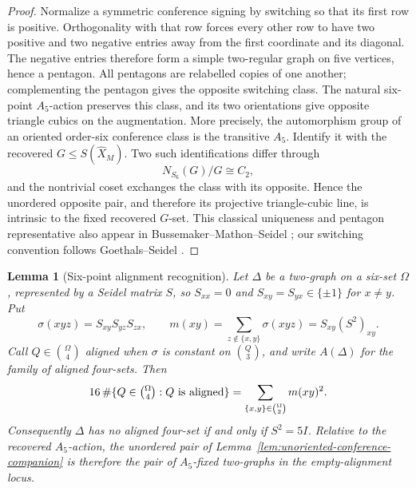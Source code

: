 \documentclass[11pt]{article}
\newtheorem{lemma}[theorem]{Lemma}
\theoremstyle{definition}
\theoremstyle{remark}
\begin{document}
\begin{proof}
Normalize a symmetric conference signing by switching so that its first row
is positive.  Orthogonality with that row forces every other row to have two
positive and two negative entries away from the first coordinate and its
diagonal.  The negative entries therefore form a simple two-regular graph on
five vertices, hence a pentagon.  All pentagons are relabelled copies of one
another; complementing the pentagon gives the opposite switching class.
The natural six-point \(A_5\)-action preserves this class, and its two
orientations give opposite triangle cubics on the augmentation.  More
precisely, the automorphism group of an oriented order-six conference class
is the transitive \(A_5\).  Identify it with the recovered
\(G\leq S(\widehat X_M)\).  Two such identifications differ through
\[
 N_{S_6}(G)/G\cong C_2,
\]
and the nontrivial coset exchanges the class with its opposite.  Hence the
unordered opposite pair, and therefore its projective triangle-cubic line,
is intrinsic to the fixed recovered \(G\)-set.  This classical uniqueness
and pentagon representative also appear in
Bussemaker--Mathon--Seidel
\cite[pp.~12, 21, and Table~9 on p.~83]{BMS1979}; our switching
convention follows Goethals--Seidel \cite[\S\S1--3]{GoethalsSeidel1967}.
\end{proof}

\begin{lemma}[Six-point alignment recognition]
\label{lem:six-point-alignment-recognition}
Let \(\Delta\) be a two-graph on a six-set \(\Omega\), represented by a
Seidel matrix \(S\), so \(S_{xx}=0\) and
\(S_{xy}=S_{yx}\in\{\pm1\}\) for \(x\ne y\).  Put
\[
 \sigma(xyz)=S_{xy}S_{yz}S_{zx},\qquad
 m(xy)=\sum_{z\notin\{x,y\}}\sigma(xyz)
      =S_{xy}(S^2)_{xy}.
\]
Call \(Q\in\binom{\Omega}{4}\) aligned when \(\sigma\) is constant on
\(\binom Q3\), and write \(A(\Delta)\) for the family of aligned four-sets.
Then
\[
 16\,\#\{Q\in\tbinom{\Omega}{4}:Q\text{ is aligned}\}
    =\sum_{\{x,y\}\in\binom{\Omega}{2}}m(xy)^2.
\]
Consequently \(\Delta\) has no aligned four-set if and only if
\(S^2=5I\).  Relative to the recovered \(A_5\)-action, the unordered pair
of Lemma~\ref{lem:unoriented-conference-companion} is therefore the pair of
\(A_5\)-fixed two-graphs in the empty-alignment locus.
\end{lemma}
\end{document}
